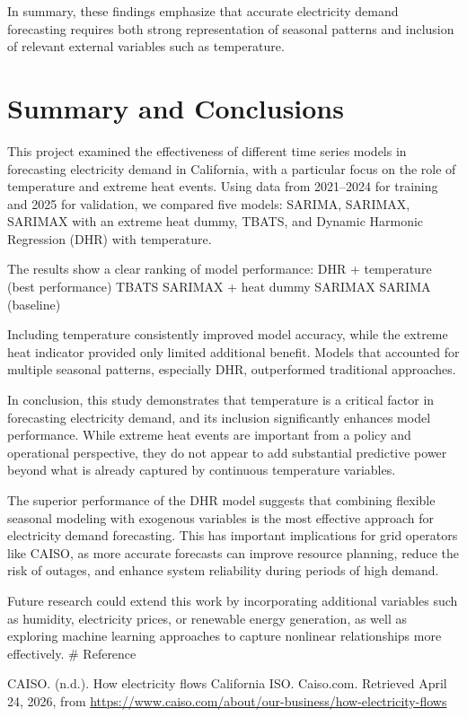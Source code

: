 \documentclass[
]{article}
\begin{document}
In summary, these findings emphasize that accurate electricity demand
forecasting requires both strong representation of seasonal patterns and
inclusion of relevant external variables such as temperature.

\section{Summary and Conclusions}\label{summary-and-conclusions}

This project examined the effectiveness of different time series models
in forecasting electricity demand in California, with a particular focus
on the role of temperature and extreme heat events. Using data from
2021--2024 for training and 2025 for validation, we compared five
models: SARIMA, SARIMAX, SARIMAX with an extreme heat dummy, TBATS, and
Dynamic Harmonic Regression (DHR) with temperature.

The results show a clear ranking of model performance: DHR + temperature
(best performance) TBATS SARIMAX + heat dummy SARIMAX SARIMA (baseline)

Including temperature consistently improved model accuracy, while the
extreme heat indicator provided only limited additional benefit. Models
that accounted for multiple seasonal patterns, especially DHR,
outperformed traditional approaches.

In conclusion, this study demonstrates that temperature is a critical
factor in forecasting electricity demand, and its inclusion
significantly enhances model performance. While extreme heat events are
important from a policy and operational perspective, they do not appear
to add substantial predictive power beyond what is already captured by
continuous temperature variables.

The superior performance of the DHR model suggests that combining
flexible seasonal modeling with exogenous variables is the most
effective approach for electricity demand forecasting. This has
important implications for grid operators like CAISO, as more accurate
forecasts can improve resource planning, reduce the risk of outages, and
enhance system reliability during periods of high demand.

Future research could extend this work by incorporating additional
variables such as humidity, electricity prices, or renewable energy
generation, as well as exploring machine learning approaches to capture
nonlinear relationships more effectively. \# Reference

CAISO. (n.d.). How electricity flows \textbar{} California ISO.
Caiso.com. Retrieved April 24, 2026, from
\url{https://www.caiso.com/about/our-business/how-electricity-flows}
\end{document}
